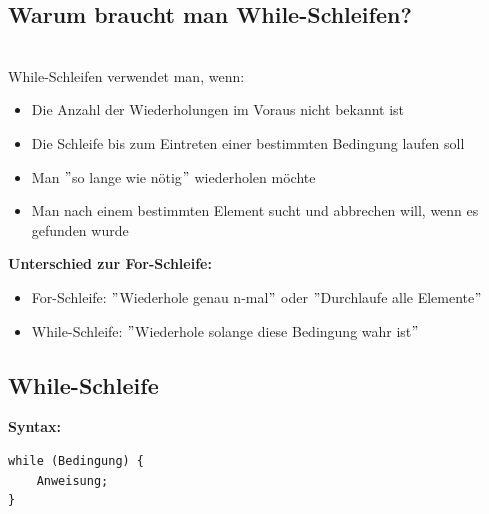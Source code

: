 \subsection*{Warum braucht man While-Schleifen?}\\
While-Schleifen verwendet man, wenn:
\begin{itemize}
	\item Die Anzahl der Wiederholungen im Voraus nicht bekannt ist
	\item Die Schleife bis zum Eintreten einer bestimmten Bedingung laufen soll
	\item Man \("\)so lange wie nötig\("\) wiederholen möchte
	\item Man nach einem bestimmten Element sucht und abbrechen will, wenn es gefunden wurde
\end{itemize}

\textbf{Unterschied zur For-Schleife:}
\begin{itemize}
	\item For-Schleife: \("\)Wiederhole genau n-mal\("\) oder \("\)Durchlaufe alle Elemente\("\)
	\item While-Schleife: \("\)Wiederhole solange diese Bedingung wahr ist\("\)
\end{itemize}

\newpage


\subsection*{While-Schleife}

\textbf{Syntax:}
\begin{lstlisting}
while (Bedingung) {
    Anweisung;
}
\end{lstlisting}

